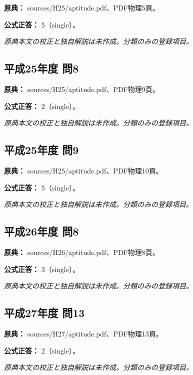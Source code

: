 \noindent\textbf{原典：} sources/H25/aptitude.pdf、PDF物理5頁。

\textbf{公式正答：} 5（single）。

\par\textit{原典本文の校正と独自解説は未作成。分類のみの登録項目。}

\subsection{平成25年度 問8}
\label{q:h25-reg-apt-08}

\noindent\textbf{原典：} sources/H25/aptitude.pdf、PDF物理9頁。

\textbf{公式正答：} 2（single）。

\par\textit{原典本文の校正と独自解説は未作成。分類のみの登録項目。}

\subsection{平成25年度 問9}
\label{q:h25-reg-apt-09}

\noindent\textbf{原典：} sources/H25/aptitude.pdf、PDF物理10頁。

\textbf{公式正答：} 5（single）。

\par\textit{原典本文の校正と独自解説は未作成。分類のみの登録項目。}

\subsection{平成26年度 問8}
\label{q:h26-reg-apt-08}

\noindent\textbf{原典：} sources/H26/aptitude.pdf、PDF物理8頁。

\textbf{公式正答：} 3（single）。

\par\textit{原典本文の校正と独自解説は未作成。分類のみの登録項目。}

\subsection{平成27年度 問13}
\label{q:h27-reg-apt-13}

\noindent\textbf{原典：} sources/H27/aptitude.pdf、PDF物理13頁。

\textbf{公式正答：} 2（single）。

\par\textit{原典本文の校正と独自解説は未作成。分類のみの登録項目。}

